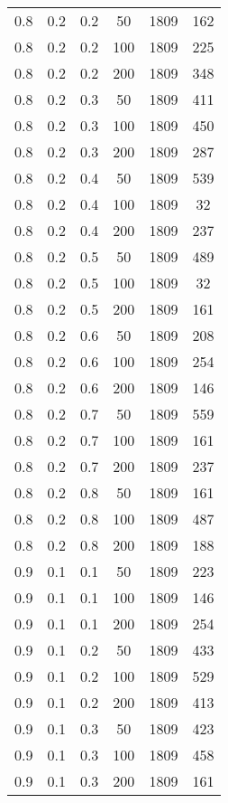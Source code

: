 \begin{center}
\begin{longtable}[c]{|c|c|c|c|c|c|}
		0.8 &  0.2 &  0.2 &   50 &  1809 &   162 \\
		0.8 &  0.2 &  0.2 &  100 &  1809 &   225 \\
		0.8 &  0.2 &  0.2 &  200 &  1809 &   348 \\
	   \hline
		0.8 &  0.2 &  0.3 &   50 &  1809 &   411 \\
		0.8 &  0.2 &  0.3 &  100 &  1809 &   450 \\
		0.8 &  0.2 &  0.3 &  200 &  1809 &   287 \\
	   \hline
		0.8 &  0.2 &  0.4 &   50 &  1809 &   539 \\
		0.8 &  0.2 &  0.4 &  100 &  1809 &    32 \\
		0.8 &  0.2 &  0.4 &  200 &  1809 &   237 \\
	   \hline
		0.8 &  0.2 &  0.5 &   50 &  1809 &   489 \\
		0.8 &  0.2 &  0.5 &  100 &  1809 &    32 \\
		0.8 &  0.2 &  0.5 &  200 &  1809 &   161 \\
	   \hline
		0.8 &  0.2 &  0.6 &   50 &  1809 &   208 \\
		0.8 &  0.2 &  0.6 &  100 &  1809 &   254 \\
		0.8 &  0.2 &  0.6 &  200 &  1809 &   146 \\
	   \hline
		0.8 &  0.2 &  0.7 &   50 &  1809 &   559 \\
		0.8 &  0.2 &  0.7 &  100 &  1809 &   161 \\
		0.8 &  0.2 &  0.7 &  200 &  1809 &   237 \\
	   \hline
		0.8 &  0.2 &  0.8 &   50 &  1809 &   161 \\
		0.8 &  0.2 &  0.8 &  100 &  1809 &   487 \\
		0.8 &  0.2 &  0.8 &  200 &  1809 &   188 \\
	   \hline
		0.9 &  0.1 &  0.1 &   50 &  1809 &   223 \\
		0.9 &  0.1 &  0.1 &  100 &  1809 &   146 \\
		0.9 &  0.1 &  0.1 &  200 &  1809 &   254 \\
	   \hline
		0.9 &  0.1 &  0.2 &   50 &  1809 &   433 \\
		0.9 &  0.1 &  0.2 &  100 &  1809 &   529 \\
		0.9 &  0.1 &  0.2 &  200 &  1809 &   413 \\
	   \hline
		0.9 &  0.1 &  0.3 &   50 &  1809 &   423 \\
		0.9 &  0.1 &  0.3 &  100 &  1809 &   458 \\
		0.9 &  0.1 &  0.3 &  200 &  1809 &   161 \\

\end{longtable}
\end{center}
